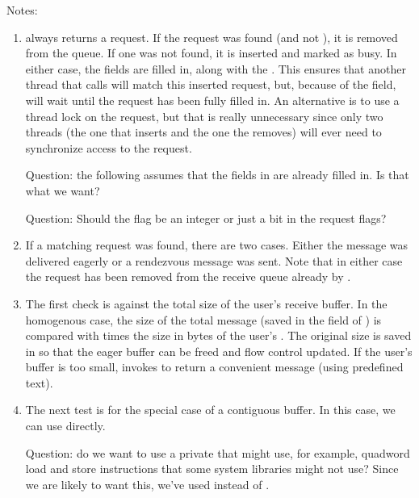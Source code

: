 Notes:
\begin{enumerate}
\item {} always returns a request.  If the
  request was found (and not ), it is removed from the queue.  If
  one was not found, it is inserted and marked as busy.  In either case, 
  the  fields are filled in, along with the .
  This ensures that another thread that calls 
  will match this inserted request, but, because of the
   field,
  will wait until the request has been fully filled in.  An alternative is to
  use a thread lock on the request, but that is really unnecessary since only
  two threads (the one that inserts and the one the removes) will ever need to
  synchronize access to the request.

  Question: the following assumes that the fields in
   are already filled in.  Is that what we want?

  Question: Should the  flag be an integer or just a bit in the
  request flags?

\item If a matching request was found, there are two cases.  Either the
  message was delivered eagerly or a rendezvous message was sent. Note that
  in either case the request has been removed from the receive queue already 
  by .

\item The first check is against the total size of the user's receive buffer.
  In the homogenous case, the size of the total message (saved in the
   field of ) is
  compared with  times the size in bytes of the user's
  .  The original size is saved in  so that the
  eager buffer can be freed and flow control updated.
  If the user's buffer is too small, invokes 
  to return a convenient message (using predefined text).

\item The next test is for the special case of a contiguous buffer.  In this
  case, we can use  directly.

  Question: do we want to use a private  that might use, for 
  example, quadword load and store instructions that some system libraries
  might not use?  Since we are likely to want this, we've used
   instead of .


\end{enumerate}

